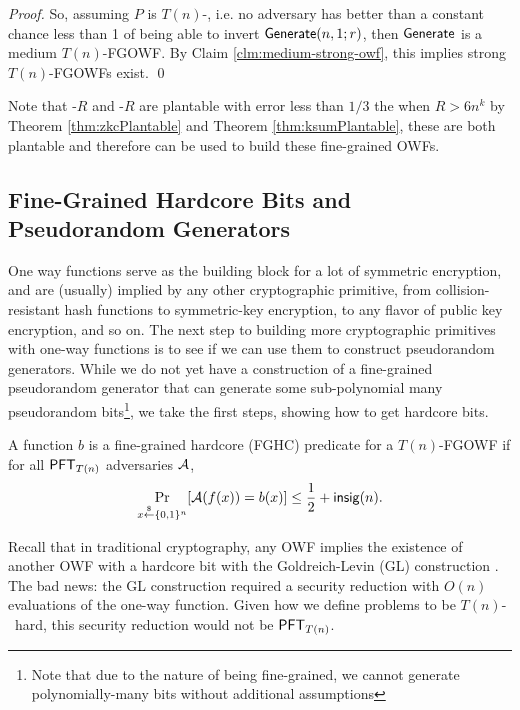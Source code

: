 \begin{proof}
	So, assuming $P$ is $T(n)$-\ACIH, i.e. no adversary has better than a constant chance less than 1 of being able to invert $\mathsf{Generate}(n,1; r)$, then $\mathsf{Generate}$ is a medium $T(n)$-FGOWF. By Claim \ref{clm:medium-strong-owf}, this implies strong $T(n)$-FGOWFs exist.
	\qed
\end{proof}

Note that \kSum-$R$ and \zkclique-$R$ are plantable with error less than $1/3$ the when $R > 6 n^k$ by Theorem \ref{thm:zkcPlantable} and Theorem \ref{thm:ksumPlantable}, these are both plantable and therefore can be used to build these fine-grained OWFs.

\subsection{Fine-Grained Hardcore Bits and Pseudorandom Generators}\label{sec:fg-hardcore-bits}
One way functions serve as the building block for a lot of symmetric encryption, and are (usually) implied by any other cryptographic primitive, from collision-resistant hash functions to symmetric-key encryption, to any flavor of public key encryption, and so on. The next step to building more cryptographic primitives with one-way functions is to see if we can use them to construct pseudorandom generators. While we do not yet have a construction of a fine-grained pseudorandom generator that can generate some sub-polynomial many pseudorandom bits\footnote{Note that due to the nature of being fine-grained, we cannot generate polynomially-many bits without additional assumptions}, we take the first steps, showing how to get hardcore bits.

\begin{definition}\label{def:fg-hcb}
	A function $b$ is a fine-grained hardcore (FGHC) predicate for a $T(n)$-FGOWF if for all $\mathsf{PFT}_{T(n)}$ adversaries $\mathcal{A}$,
	\[ \Pr_{x \stackrel{\scriptscriptstyle{\$}}{\gets} \{0,1\}^n}[ \mathcal{A}(f(x)) = b(x) ] \le \frac 1 2 + \mathsf{insig}(n). \]
\end{definition}

Recall that in traditional cryptography, any OWF implies the existence of another OWF with a hardcore bit with the Goldreich-Levin (GL) construction \cite{hardCoreBitsAndXorLemmaFromGL}. The bad news: the GL construction required a security reduction with $O(n)$ evaluations of the one-way function. Given how we define problems to be $T(n)$-\ACIH~hard, this security reduction would not be $\mathsf{PFT}_{T(n)}$.


